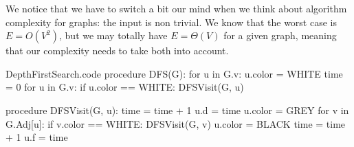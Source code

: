 \documentclass[a4paper]{article}
\begin{document}
{{        We notice that we have to switch a bit our mind when we think about algorithm complexity for graphs: the input is non trivial. We know that the worst case is $E = O\left(V^2\right)$, but we may totally have $E = \Theta\left(V\right)$ for a given graph, meaning that our complexity needs to take both into account.
    }


}

\begin{filecontents*}[overwrite]{DepthFirstSearch.code}
procedure DFS(G):
    for u in G.v:
        u.color = WHITE
    time = 0
    for u in G.v:
        if u.color == WHITE:
            DFSVisit(G, u)

procedure DFSVisit(G, u):
    time = time + 1
    u.d = time
    u.color = GREY
    for v in G.Adj[u]:
        if v.color == WHITE:
            DFSVisit(G, v)
    u.color = BLACK
    time = time + 1
    u.f = time
\end{filecontents*}
\end{document}
